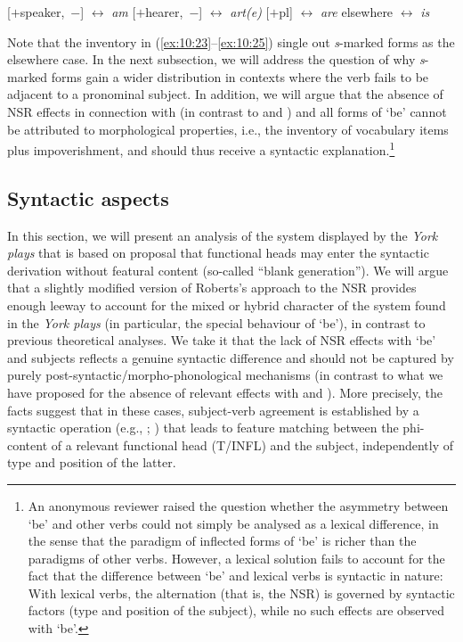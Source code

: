 \documentclass[output=paper]{langsci/langscibook}
\begin{document}
\ea\label{ex:10:25}
\ea \mbox{[$+$speaker, $-$\Pl]} $\leftrightarrow$ \emph{am}
\ex \mbox{[$+$hearer, $-$\Pl]} $\leftrightarrow$ \emph{art(e)}
\ex \mbox{[$+$pl]} $\leftrightarrow$ \emph{are}
\ex elsewhere $\leftrightarrow$ \emph{is}
\z
\z

Note that the inventory in (\ref{ex:10:23}--\ref{ex:10:25}) single out \emph{s}-marked forms as the
elsewhere case. In the next subsection, we will address the question of why
\emph{s}-marked forms gain a wider distribution in contexts where the verb
fails to be adjacent to a pronominal subject. In addition, we will argue that
the absence of \gls{NSR} effects in connection with \Fsg{} (in contrast to
\Ssg{} and \Tsg{}) and all forms of `be' cannot be attributed to morphological
properties, i.e., the inventory of vocabulary items plus impoverishment, and
should thus receive a syntactic explanation.\footnote{An anonymous reviewer
    raised the question whether the asymmetry between `be' and other verbs
    could not simply be analysed as a lexical difference, in the sense that the
    paradigm of inflected forms of `be' is richer than the paradigms of other
    verbs.  However, a lexical solution fails to account for the fact that the
    difference between `be' and lexical verbs is syntactic in nature: With
    lexical verbs, the  alternation (that is, the
\gls{NSR}) is governed by syntactic factors (type and
position of the subject), while no such effects are observed with `be'.}

\subsection{Syntactic aspects}\label{sub:10.4.2}

In this section, we will present an analysis of the  system
displayed by the \emph{York plays} that is based on 
proposal that functional heads may enter the syntactic derivation without
featural content (so-called ``blank generation''). We will argue that a
slightly modified version of Roberts's approach to the \gls{NSR} provides enough leeway to account for the mixed or hybrid
    character of the  system found in the \emph{York plays} (in
    particular, the special behaviour of `be'), in contrast to previous
    theoretical analyses. We take it that the lack of \gls{NSR} effects with `be' and \Fsg{} subjects reflects a genuine
    syntactic difference and should not be captured by purely
    post-syntactic/morpho-phonological mechanisms (in contrast to what we have
    proposed for the absence of relevant effects with \Ssg{} and \Tsg{}). More
    precisely, the facts suggest that in these cases, subject-verb agreement is
    established by a syntactic operation (e.g., ;
    \citealt{Chomsky2000}) that leads to feature matching between the
    phi-content of a relevant functional head (T/INFL) and
    the subject, independently of type and position of the latter.
\end{document}
